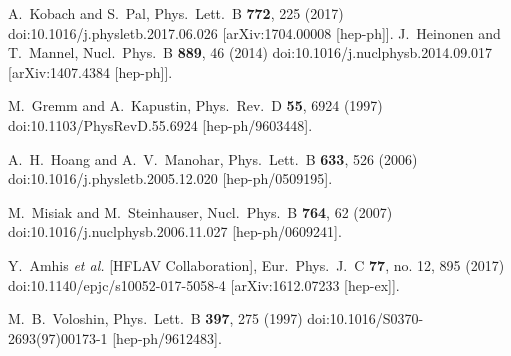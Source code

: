 \begin{thebibliography}{99}
  A.~Kobach and S.~Pal,
  Phys.\ Lett.\ B {\bf 772}, 225 (2017)
  doi:10.1016/j.physletb.2017.06.026
  [arXiv:1704.00008 [hep-ph]].
  J.~Heinonen and T.~Mannel,
  Nucl.\ Phys.\ B {\bf 889}, 46 (2014)
  doi:10.1016/j.nuclphysb.2014.09.017
  [arXiv:1407.4384 [hep-ph]].
  
  M.~Gremm and A.~Kapustin,
  Phys.\ Rev.\ D {\bf 55}, 6924 (1997)
  doi:10.1103/PhysRevD.55.6924
  [hep-ph/9603448].
  
  A.~H.~Hoang and A.~V.~Manohar,
  Phys.\ Lett.\ B {\bf 633}, 526 (2006)
  doi:10.1016/j.physletb.2005.12.020
  [hep-ph/0509195].
  
  M.~Misiak and M.~Steinhauser,
  Nucl.\ Phys.\ B {\bf 764}, 62 (2007)
  doi:10.1016/j.nuclphysb.2006.11.027
  [hep-ph/0609241].
  
  Y.~Amhis {\it et al.} [HFLAV Collaboration],
  Eur.\ Phys.\ J.\ C {\bf 77}, no. 12, 895 (2017)
  doi:10.1140/epjc/s10052-017-5058-4
  [arXiv:1612.07233 [hep-ex]].
  
  M.~B.~Voloshin,
  Phys.\ Lett.\ B {\bf 397}, 275 (1997)
  doi:10.1016/S0370-2693(97)00173-1
  [hep-ph/9612483].
  

\end{thebibliography}
